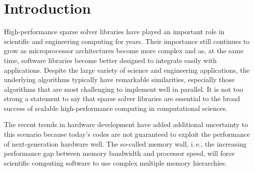 \chapter{Introduction }

High-performance sparse solver libraries have 
played an important role in
scientific and engineering computing for years. Their importance still
continues to grow as microprocessor architectures become more complex
and as, at the same time,
software libraries become better designed to integrate easily
with
applications. 
%
Despite %
the large variety of
science and engineering applications, the underlying algorithms typically have
remarkable similarities, especially those algorithms that are most
challenging to implement well in parallel. 
It is not too strong a
statement to say that %
sparse solver
libraries are essential to the
broad success of scalable high-performance computing in computational
sciences. 

The recent trends in hardware development have added
additional 
uncertainty
to this scenario 
because today's codes are not
guaranteed to exploit the performance of next-generation hardware 
well.
The so-called memory wall, i.\,e., the increasing
performance gap between memory bandwidth and processor speed, will force
scientific computing software to %
use %
complex multiple memory hierarchies.  



